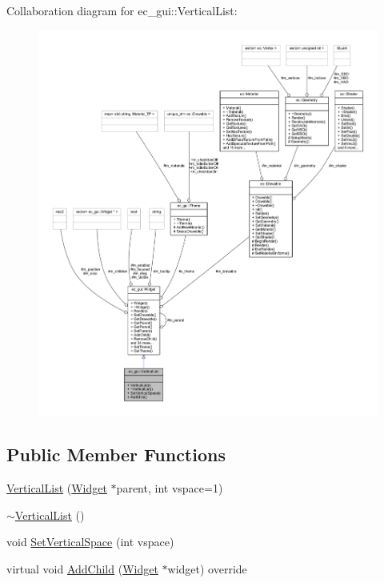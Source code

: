 Collaboration diagram for ec\+\_\+gui\+:\+:Vertical\+List\+:\nopagebreak
\begin{figure}[H]
\begin{center}
\leavevmode
\includegraphics[width=350pt]{classec__gui_1_1_vertical_list__coll__graph}
\end{center}
\end{figure}
\subsection*{Public Member Functions}
\begin{DoxyCompactItemize}
\item 
\mbox{\hyperlink{classec__gui_1_1_vertical_list_af7c9ad4079944e77219be0a3bf623278}{Vertical\+List}} (\mbox{\hyperlink{classec__gui_1_1_widget}{Widget}} $\ast$parent, int vspace=1)
\item 
\mbox{\hyperlink{classec__gui_1_1_vertical_list_acf95f2d95ebe84bcbaf7679093281241}{$\sim$\+Vertical\+List}} ()
\item 
void \mbox{\hyperlink{classec__gui_1_1_vertical_list_ab7b23229f0082d66d5880cb24d63fc51}{Set\+Vertical\+Space}} (int vspace)
\item 
virtual void \mbox{\hyperlink{classec__gui_1_1_vertical_list_a3333415b5bef7e007bc5f62126efa620}{Add\+Child}} (\mbox{\hyperlink{classec__gui_1_1_widget}{Widget}} $\ast$widget) override
\end{DoxyCompactItemize}
